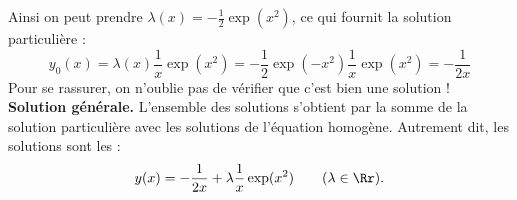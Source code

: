 {\begin{enumerate}
{    Ainsi on peut prendre $\lambda(x) = -\frac12\exp(x^2)$, ce qui fournit la solution particulière :
    $$y_0(x) = \lambda(x) \frac1x\exp(x^2) = -\frac12\exp(-x^2)\frac1x\exp(x^2) = -\frac1{2x}$$    
    Pour se rassurer, on n'oublie pas de vérifier que c'est bien une solution !
\textbf{Solution générale.}    
    L'ensemble des solutions s'obtient par la somme de la solution particulière avec les solutions de l'équation
    homogène. Autrement dit, les solutions sont les :
    $$y(x) = -\frac1{2x} + \lambda \frac1x\exp(x^2)\qquad (\lambda\in\Rr).$$
}
\end{enumerate}
}
